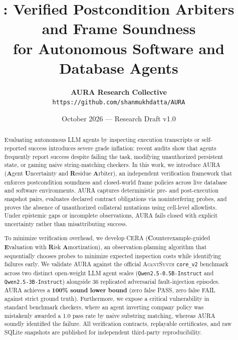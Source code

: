 \documentclass[11pt,a4paper]{article}
\title{\textbf{\aura: Verified Postcondition Arbiters and Frame Soundness\\for Autonomous Software and Database Agents}}
\author{
  \textbf{AURA Research Collective} \\
  \texttt{https://github.com/shanmukhdatta/AURA}
}
\date{October 2026 --- Research Draft v1.0}
\newcommand{\aura}{\textsc{AURA}}
\newcommand{\cera}{\textsc{CERA}}
\newcommand{\agentsynth}{\textsc{AgentSynth}}
\begin{document}
\maketitle

\begin{abstract}
Evaluating autonomous LLM agents by inspecting execution transcripts or self-reported success introduces severe grade inflation: recent audits show that agents frequently report success despite failing the task, modifying unauthorized persistent state, or gaming naive string-matching checkers. In this work, we introduce \aura{} (\textbf{A}gent \textbf{U}ncertainty and \textbf{R}esidue \textbf{A}rbiter), an independent verification framework that enforces postcondition soundness and closed-world frame policies across live database and software environments. \aura{} captures deterministic pre- and post-execution snapshot pairs, evaluates declared contract obligations via noninterfering probes, and proves the absence of unauthorized collateral mutations using cell-level allowlists. Under epistemic gaps or incomplete observations, \aura{} fails closed with explicit uncertainty rather than misattributing success. 

To minimize verification overhead, we develop \cera{} (\textbf{C}ounterexample-guided \textbf{E}valuation with \textbf{R}isk \textbf{A}mortization), an observation-planning algorithm that sequentially chooses probes to minimize expected inspection costs while identifying failures early. We validate \aura{} against the official \agentsynth{} \texttt{core\_v2} benchmark across two distinct open-weight LLM agent scales (\texttt{Qwen2.5-0.5B-Instruct} and \texttt{Qwen2.5-3B-Instruct}) alongside 36 replicated adversarial fault-injection episodes. \aura{} achieves a \textbf{100\% sound lower bound} (zero false PASS, zero false FAIL against strict ground truth). Furthermore, we expose a critical vulnerability in standard benchmark checkers, where an agent inverting company policy was mistakenly awarded a 1.0 pass rate by naive substring matching, whereas \aura{} soundly identified the failure. All verification contracts, replayable certificates, and raw SQLite snapshots are published for independent third-party reproducibility.
\end{abstract}
\end{document}
